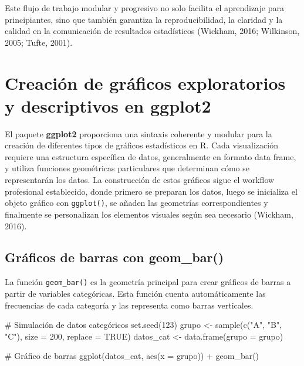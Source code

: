 \documentclass[
  spanish,
  a4paper,
  DIV=11,
  numbers=noendperiod,
  onepage,
  openany]{scrreprt}
\newenvironment{Shaded}{\begin{snugshade}}{\end{snugshade}}
\newcommand{\AttributeTok}[1]{\textcolor[rgb]{0.40,0.45,0.13}{#1}}
\newcommand{\CommentTok}[1]{\textcolor[rgb]{0.37,0.37,0.37}{#1}}
\newcommand{\ConstantTok}[1]{\textcolor[rgb]{0.56,0.35,0.01}{#1}}
\newcommand{\DecValTok}[1]{\textcolor[rgb]{0.68,0.00,0.00}{#1}}
\newcommand{\FunctionTok}[1]{\textcolor[rgb]{0.28,0.35,0.67}{#1}}
\newcommand{\NormalTok}[1]{\textcolor[rgb]{0.00,0.23,0.31}{#1}}
\newcommand{\OtherTok}[1]{\textcolor[rgb]{0.00,0.23,0.31}{#1}}
\newcommand{\SpecialCharTok}[1]{\textcolor[rgb]{0.37,0.37,0.37}{#1}}
\newcommand{\StringTok}[1]{\textcolor[rgb]{0.13,0.47,0.30}{#1}}
\begin{document}
Este flujo de trabajo modular y progresivo no solo facilita el
aprendizaje para principiantes, sino que también garantiza la
reproducibilidad, la claridad y la calidad en la comunicación de
resultados estadísticos (Wickham, 2016; Wilkinson, 2005; Tufte, 2001).

\section{Creación de gráficos exploratorios y descriptivos en
ggplot2}\label{creaciuxf3n-de-gruxe1ficos-exploratorios-y-descriptivos-en-ggplot2}

El paquete \textbf{ggplot2} proporciona una sintaxis coherente y modular
para la creación de diferentes tipos de gráficos estadísticos en R. Cada
visualización requiere una estructura específica de datos, generalmente
en formato data frame, y utiliza funciones geométricas particulares que
determinan cómo se representarán los datos. La construcción de estos
gráficos sigue el workflow profesional establecido, donde primero se
preparan los datos, luego se inicializa el objeto gráfico con
\texttt{ggplot()}, se añaden las geometrías correspondientes y
finalmente se personalizan los elementos visuales según sea necesario
(Wickham, 2016).

\subsection{Gráficos de barras con
geom\_bar()}\label{gruxe1ficos-de-barras-con-geom_bar}

La función \texttt{geom\_bar()} es la geometría principal para crear
gráficos de barras a partir de variables categóricas. Esta función
cuenta automáticamente las frecuencias de cada categoría y las
representa como barras verticales.

\begin{Shaded}
\begin{Highlighting}[]
\CommentTok{\# Simulación de datos categóricos}
\FunctionTok{set.seed}\NormalTok{(}\DecValTok{123}\NormalTok{)}
\NormalTok{grupo }\OtherTok{\textless{}{-}} \FunctionTok{sample}\NormalTok{(}\FunctionTok{c}\NormalTok{(}\StringTok{"A"}\NormalTok{, }\StringTok{"B"}\NormalTok{, }\StringTok{"C"}\NormalTok{), }\AttributeTok{size =} \DecValTok{200}\NormalTok{, }\AttributeTok{replace =} \ConstantTok{TRUE}\NormalTok{)}
\NormalTok{datos\_cat }\OtherTok{\textless{}{-}} \FunctionTok{data.frame}\NormalTok{(}\AttributeTok{grupo =}\NormalTok{ grupo)}

\CommentTok{\# Gráfico de barras}
\FunctionTok{ggplot}\NormalTok{(datos\_cat, }\FunctionTok{aes}\NormalTok{(}\AttributeTok{x =}\NormalTok{ grupo)) }\SpecialCharTok{+}
  \FunctionTok{geom\_bar}\NormalTok{()}
\end{Highlighting}
\end{Shaded}
\end{document}
